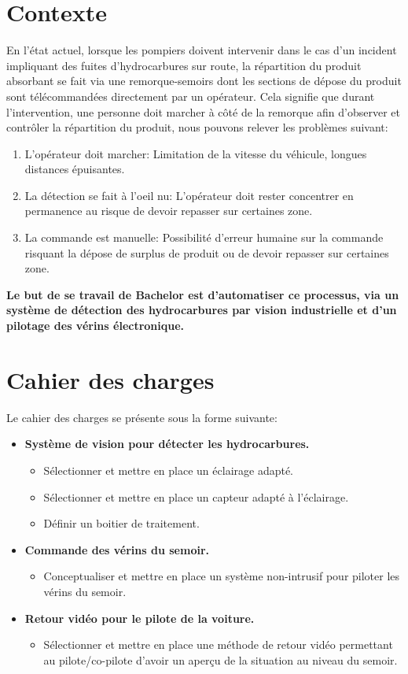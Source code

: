 \section{Contexte}
En l'état actuel, lorsque les pompiers doivent intervenir dans le cas d'un incident impliquant des fuites d'hydrocarbures sur route, la répartition
du produit absorbant se fait via une remorque-semoirs dont les sections de dépose du produit sont télécommandées directement par un opérateur.
Cela signifie que durant l'intervention, une personne doit marcher à côté de la remorque afin d'observer et contrôler la répartition du produit, nous pouvons relever les problèmes suivant:
\begin{enumerate}
    \item L'opérateur doit marcher: Limitation de la vitesse du véhicule, longues distances épuisantes.
    \item La détection se fait à l'oeil nu: L'opérateur doit rester concentrer en permanence au risque de devoir repasser sur certaines zone.
    \item La commande est manuelle: Possibilité d'erreur humaine sur la commande risquant la dépose de surplus de produit ou de devoir repasser sur certaines zone.
\end{enumerate}
\textbf{Le but de se travail de Bachelor est d'automatiser ce processus, via un système de détection des hydrocarbures par vision industrielle et d'un pilotage des vérins électronique.}
\section{Cahier des charges \label{cdc}}
Le cahier des charges se présente sous la forme suivante:
\begin{itemize}
    \item \textbf{Système de vision pour détecter les hydrocarbures.}
          \begin{itemize}
              \item Sélectionner et mettre en place un éclairage adapté.
              \item Sélectionner et mettre en place un capteur adapté à l'éclairage.
              \item Définir un boitier de traitement.
          \end{itemize}
    \item \textbf{Commande des vérins du semoir.}
          \begin{itemize}
              \item Conceptualiser et mettre en place un système non-intrusif pour piloter les vérins du semoir.
          \end{itemize}
    \item \textbf{Retour vidéo pour le pilote de la voiture.}
          \begin{itemize}
              \item Sélectionner et mettre en place une méthode de retour vidéo permettant au pilote/co-pilote d'avoir un aperçu de la situation au niveau du semoir.
          \end{itemize}
\end{itemize}
